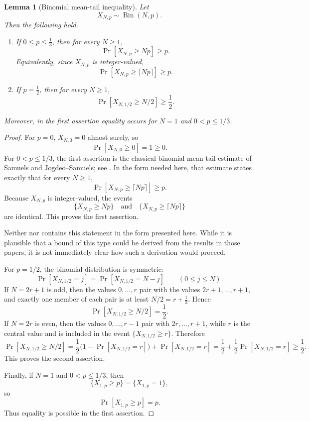 \documentclass[12pt]{article}
\theoremstyle{definition}
\theoremstyle{plain}
\newtheorem{lemma}[definition]{Lemma}
\theoremstyle{remark}
\newcommand{\review}[1]{\begin{reviewbox}#1\end{reviewbox}}
\begin{document}
\begin{lemma}[Binomial mean-tail inequality]\label{lem:binomial}
Let
\[
X_{N,p}\sim\operatorname{Bin}(N,p).
\]
Then the following hold.

\begin{enumerate}
\item If \(0\le p\le \frac13\), then for every \(N\ge1\),
\[
\Pr[X_{N,p}\ge Np]\ge p.
\]
Equivalently, since \(X_{N,p}\) is integer-valued,
\[
\Pr[X_{N,p}\ge \lceil Np\rceil]\ge p.
\]

\item If \(p=\frac12\), then for every \(N\ge1\),
\[
\Pr[X_{N,1/2}\ge N/2]\ge \frac12.
\]
\end{enumerate}
Moreover, in the first assertion equality occurs for \(N=1\) and \(0<p\le1/3\).
\end{lemma}

\begin{proof}
For \(p=0\), \(X_{N,0}=0\) almost surely, so
\[
\Pr[X_{N,0}\ge0]=1\ge0.
\]
For \(0<p\le1/3\), the first assertion is the classical binomial mean-tail estimate of Samuels and Jogdeo--Samuels; see \cite{Samuels1965,JogdeoSamuels1968}. In the form needed here, that estimate states exactly that for every \(N\ge1\),
\[
\Pr[X_{N,p}\ge \lceil Np\rceil]\ge p.
\]
Because \(X_{N,p}\) is integer-valued, the events
\[
\{X_{N,p}\ge Np\}
\quad\text{and}\quad
\{X_{N,p}\ge \lceil Np\rceil\}
\]
are identical. This proves the first assertion. 

\review{Neither \cite{Samuels1965} nor \cite{JogdeoSamuels1968} contains this statement in the form presented here. While it is plausible that a bound of this type could be derived from the results in those papers, it is not immediately clear how such a derivation would proceed.}
For \(p=1/2\), the binomial distribution is symmetric:
\[
\Pr[X_{N,1/2}=j]=\Pr[X_{N,1/2}=N-j]
\qquad (0\le j\le N).
\]
If \(N=2r+1\) is odd, then the values \(0,\ldots,r\) pair with the values \(2r+1,\ldots,r+1\), and exactly one member of each pair is at least \(N/2=r+\frac12\). Hence
\[
\Pr[X_{N,1/2}\ge N/2]=\frac12.
\]
If \(N=2r\) is even, then the values \(0,\ldots,r-1\) pair with \(2r,\ldots,r+1\), while \(r\) is the central value and is included in the event \(\{X_{N,1/2}\ge r\}\). Therefore
\[
\Pr[X_{N,1/2}\ge N/2]
=
\frac12\bigl(1-\Pr[X_{N,1/2}=r]\bigr)
+\Pr[X_{N,1/2}=r]
=
\frac12+\frac12\Pr[X_{N,1/2}=r]
\ge\frac12.
\]
This proves the second assertion.

Finally, if \(N=1\) and \(0<p\le1/3\), then
\[
\{X_{1,p}\ge p\}=\{X_{1,p}=1\},
\]
so
\[
\Pr[X_{1,p}\ge p]=p.
\]
Thus equality is possible in the first assertion.
\end{proof}
\end{document}
